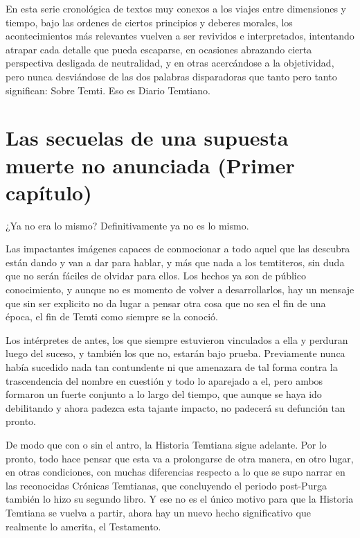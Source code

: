 \documentclass[
  spanish,
]{book}
\begin{document}
En esta serie cronológica de textos muy conexos a los viajes entre dimensiones y tiempo, bajo las ordenes de ciertos principios y deberes morales, los acontecimientos más relevantes vuelven a ser revividos e interpretados, intentando atrapar cada detalle que pueda escaparse, en ocasiones abrazando cierta perspectiva desligada de neutralidad, y en otras acercándose a la objetividad, pero nunca desviándose de las dos palabras disparadoras que tanto pero tanto significan: Sobre Temti. Eso es Diario Temtiano.

\hypertarget{las-secuelas-de-una-supuesta-muerte-no-anunciada-primer-capuxedtulo}{%
\chapter{Las secuelas de una supuesta muerte no anunciada (Primer capítulo)}\label{las-secuelas-de-una-supuesta-muerte-no-anunciada-primer-capuxedtulo}}

¿Ya no era lo mismo? Definitivamente ya no es lo mismo.

Las impactantes imágenes capaces de conmocionar a todo aquel que las descubra están dando y van a dar para hablar, y más que nada a los temtiteros, sin duda que no serán fáciles de olvidar para ellos. Los hechos ya son de público conocimiento, y aunque no es momento de volver a desarrollarlos, hay un mensaje que sin ser explicito no da lugar a pensar otra cosa que no sea el fin de una época, el fin de Temti como siempre se la conoció.

Los intérpretes de antes, los que siempre estuvieron vinculados a ella y perduran luego del suceso, y también los que no, estarán bajo prueba. Previamente nunca había sucedido nada tan contundente ni que amenazara de tal forma contra la trascendencia del nombre en cuestión y todo lo aparejado a el, pero ambos formaron un fuerte conjunto a lo largo del tiempo, que aunque se haya ido debilitando y ahora padezca esta tajante impacto, no padecerá su defunción tan pronto.

De modo que con o sin el antro, la Historia Temtiana sigue adelante. Por lo pronto, todo hace pensar que esta va a prolongarse de otra manera, en otro lugar, en otras condiciones, con muchas diferencias respecto a lo que se supo narrar en las reconocidas Crónicas Temtianas, que concluyendo el periodo post-Purga también lo hizo su segundo libro. Y ese no es el único motivo para que la Historia Temtiana se vuelva a partir, ahora hay un nuevo hecho significativo que realmente lo amerita, el Testamento.
\end{document}
